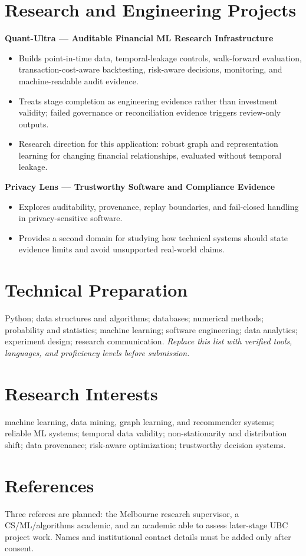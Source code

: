 \documentclass[11pt]{article}
\begin{document}
\section*{Research and Engineering Projects}
\textbf{Quant-Ultra --- Auditable Financial ML Research Infrastructure}
\begin{itemize}
\item Builds point-in-time data, temporal-leakage controls, walk-forward evaluation, transaction-cost-aware backtesting, risk-aware decisions, monitoring, and machine-readable audit evidence.
\item Treats stage completion as engineering evidence rather than investment validity; failed governance or reconciliation evidence triggers review-only outputs.
\item Research direction for this application: robust graph and representation learning for changing financial relationships, evaluated without temporal leakage.
\end{itemize}

\begin{samepage}
\textbf{Privacy Lens --- Trustworthy Software and Compliance Evidence}
\begin{itemize}
\item Explores auditability, provenance, replay boundaries, and fail-closed handling in privacy-sensitive software.
\item Provides a second domain for studying how technical systems should state evidence limits and avoid unsupported real-world claims.
\end{itemize}
\end{samepage}

\section*{Technical Preparation}
Python; data structures and algorithms; databases; numerical methods; probability and statistics; machine learning; software engineering; data analytics; experiment design; research communication. \textit{Replace this list with verified tools, languages, and proficiency levels before submission.}

\section*{Research Interests}
machine learning, data mining, graph learning, and recommender systems; reliable ML systems; temporal data validity; non-stationarity and distribution shift; data provenance; risk-aware optimization; trustworthy decision systems.

\section*{References}
Three referees are planned: the Melbourne research supervisor, a CS/ML/algorithms academic, and an academic able to assess later-stage UBC project work. Names and institutional contact details must be added only after consent.
\end{document}
